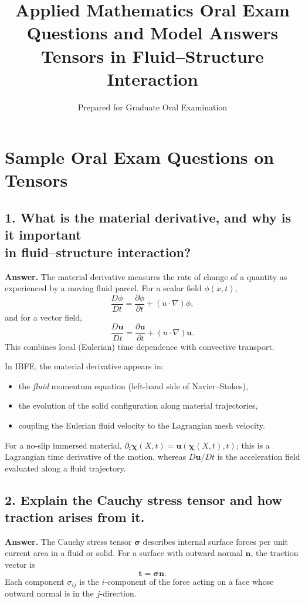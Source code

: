 \documentclass[12pt]{article}
\title{\vspace{-2em}\textbf{Applied Mathematics Oral Exam Questions and Model Answers}\\
\large Tensors in Fluid--Structure Interaction}
\author{Prepared for Graduate Oral Examination}
\date{}
\begin{document}
\section*{Sample Oral Exam Questions on Tensors}

\subsection*{1. What is the material derivative, and why is it important\\in fluid--structure interaction?}

\textbf{Answer.}
The material derivative measures the rate of change of a quantity as experienced
by a moving fluid parcel. For a scalar field $\phi(x,t)$,
\[
\frac{D\phi}{Dt}
= \frac{\partial \phi}{\partial t} + (u\cdot\nabla)\phi,
\]
and for a vector field,
\[
\frac{D\mathbf{u}}{Dt}
= \frac{\partial \mathbf{u}}{\partial t} + (u\cdot\nabla) \mathbf{u}.
\]
This combines local (Eulerian) time dependence with convective transport.

In IBFE, the material derivative appears in:
\begin{itemize}
    \item the \emph{fluid} momentum equation (left-hand side of Navier--Stokes),
    \item the evolution of the solid configuration along material trajectories,
    \item coupling the Eulerian fluid velocity to the Lagrangian mesh velocity.
\end{itemize}

For a no-slip immersed material, $\partial_t\boldsymbol\chi(X,t)=\mathbf u(\boldsymbol\chi(X,t),t)$; this is a Lagrangian time derivative of the motion, whereas $D\mathbf u/Dt$ is the acceleration field evaluated along a fluid trajectory.

\subsection*{2. Explain the Cauchy stress tensor and how traction arises from it.}

\textbf{Answer.}
The Cauchy stress tensor $\boldsymbol{\sigma}$ describes internal surface
forces per unit current area in a fluid or solid.
For a surface with outward normal $\mathbf{n}$, the traction vector is
\[
\mathbf{t} = \boldsymbol{\sigma}\mathbf{n}.
\]
Each component $\sigma_{ij}$ is the $i$-component of the force acting on a face
whose outward normal is in the $j$-direction.
\end{document}

